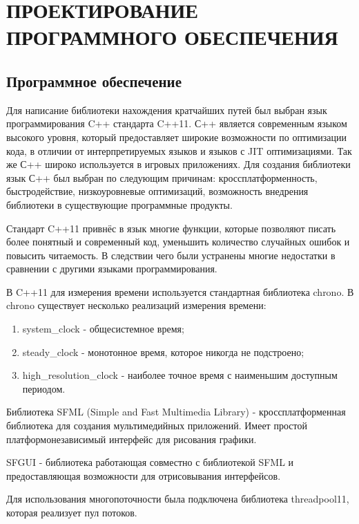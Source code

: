 \section[Проектирование программного обеспечения]{\MakeTextUppercase{ПРОЕКТИРОВАНИЕ ПРОГРАММНОГО ОБЕСПЕЧЕНИЯ}}
\subsection{Программное обеспечение}

Для написание библиотеки нахождения кратчайших путей был выбран язык программирования C++ стандарта C++11. С++ является современным языком высокого уровня, который предоставляет широкие возможности по оптимизации кода, в отличии от интерпретируемых языков и языков с JIT оптимизациями. Так же С++ широко используется в игровых приложениях. Для создания библиотеки язык С++ был выбран по следующим причинам: кроссплатформенность, быстродействие, низкоуровневые оптимизаций, возможность внедрения библиотеки в существующие программные продукты. 

Стандарт C++11 привнёс в язык многие функции, которые позволяют писать более понятный и современный код, уменьшить количество случайных ошибок и повысить читаемость. В следствии чего были устранены многие недостатки в сравнении с другими языками программирования.

В C++11 для измерения времени используется стандартная библиотека chrono. В chrono существует несколько реализаций измерения времени:

\begin{enumerate}
    \item system\_clock - общесистемное время;
    \item steady\_clock - монотонное время, которое никогда не подстроено;
    \item high\_resolution\_clock - наиболее точное время с наименьшим доступным периодом.  
\end{enumerate} 

Библиотека SFML (Simple and Fast Multimedia Library) - кроссплатформенная библиотека для создания мультимедийных приложений. Имеет простой платформонезависимый интерфейс для рисования графики.

SFGUI - библиотека работающая совместно с библиотекой SFML и предоставляющая возможности для отрисовывания интерфейсов.

Для использования многопоточности была подключена библиотека threadpool11, которая реализует пул потоков.

